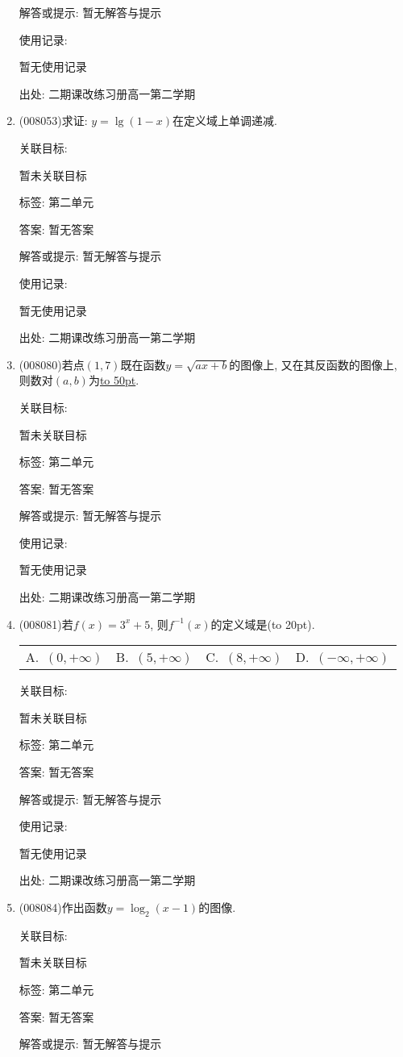 \documentclass[10pt,a4paper]{article}
\newcommand{\blank}[1]{\underline{\hbox to #1pt{}}}
\newcommand{\bracket}[1]{(\hbox to #1pt{})}
\newcommand{\fourch}[4]{\par\begin{tabular}{p{.23\textwidth}p{.23\textwidth}p{.23\textwidth}p{.23\textwidth}}
A.~#1 &B.~#2& C.~#3& D.~#4
\end{tabular}}
\begin{document}
\begin{enumerate}[1.]
解答或提示: 暂无解答与提示

使用记录:

暂无使用记录


出处: 二期课改练习册高一第二学期
\item { (008053)}求证: $y=\lg(1-x)$在定义域上单调递减.


关联目标:

暂未关联目标



标签: 第二单元

答案: 暂无答案

解答或提示: 暂无解答与提示

使用记录:

暂无使用记录


出处: 二期课改练习册高一第二学期
\item { (008080)}若点$(1, 7)$既在函数$y=\sqrt {ax+b}$的图像上, 又在其反函数的图像上, 则数对$(a,b)$为\blank{50}.


关联目标:

暂未关联目标



标签: 第二单元

答案: 暂无答案

解答或提示: 暂无解答与提示

使用记录:

暂无使用记录


出处: 二期课改练习册高一第二学期
\item { (008081)}若$f(x)=3^x+5$, 则$f^{-1}(x)$的定义域是\bracket{20}.
\fourch{$(0,+\infty)$}{$(5,+\infty)$}{$(8,+\infty)$}{$(-\infty ,+\infty)$}


关联目标:

暂未关联目标



标签: 第二单元

答案: 暂无答案

解答或提示: 暂无解答与提示

使用记录:

暂无使用记录


出处: 二期课改练习册高一第二学期
\item { (008084)}作出函数$y=\log _2(x-1)$的图像.


关联目标:

暂未关联目标



标签: 第二单元

答案: 暂无答案

解答或提示: 暂无解答与提示


\end{enumerate}
\end{document}
